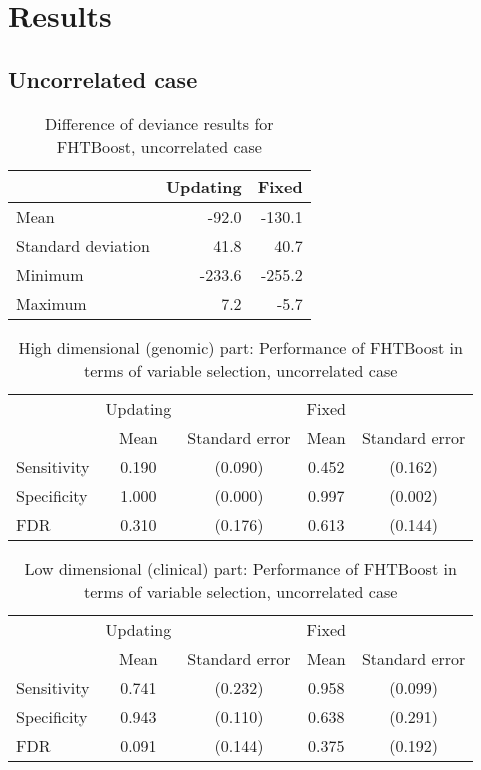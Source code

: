 \section{Results}
\subsection{Uncorrelated case}

\begin{table}
\caption{Difference of deviance results for FHTBoost, uncorrelated case}
\label{table:uncorrelated-deviance}
\centering
\begin{tabular}{l|rr}
\toprule
& Updating & Fixed \\
\hline
Mean               &  -92.0  & -130.1  \\
Standard deviation &   41.8  &   40.7  \\
Minimum            & -233.6  & -255.2  \\
Maximum            &    7.2  &   -5.7  \\
\bottomrule
\end{tabular}
\end{table}

\begin{table}
\caption{High dimensional (genomic) part: Performance of FHTBoost in terms of variable selection, uncorrelated case}
\label{table:uncorrelated-y0}
\centering
\begin{tabular}{l|cc|cc}
\toprule
& Updating & & Fixed & \\
& Mean & Standard error & Mean & Standard error \\
\hline
Sensitivity & 0.190 & (0.090) & 0.452 & (0.162) \\
Specificity & 1.000 & (0.000) & 0.997 & (0.002) \\
FDR         & 0.310 & (0.176) & 0.613 & (0.144) \\
\bottomrule
\end{tabular}
\end{table}

\begin{table}
\caption{Low dimensional (clinical) part: Performance of FHTBoost in terms of variable selection, uncorrelated case}
\label{table:uncorrelated-mu}
\centering
\begin{tabular}{l|cc|cc}
\toprule
& Updating & & Fixed & \\
& Mean & Standard error & Mean & Standard error \\
\hline
Sensitivity & 0.741 & (0.232) & 0.958 & (0.099) \\
Specificity & 0.943 & (0.110) & 0.638 & (0.291) \\
FDR         & 0.091 & (0.144) & 0.375 & (0.192) \\
\bottomrule
\end{tabular}
\end{table}


